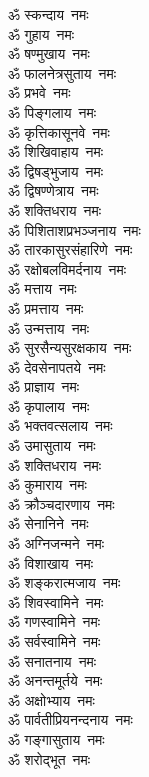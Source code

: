 
\begin{multicols}{2}
\begin{flushleft}
ॐ स्कन्दाय~नमः\\
ॐ गुहाय~नमः\\
ॐ षण्मुखाय~नमः\\
ॐ फालनेत्रसुताय~नमः\\
ॐ प्रभवे~नमः\\
ॐ पिङ्गलाय~नमः\\
ॐ कृत्तिकासूनवे~नमः\\
ॐ शिखिवाहाय~नमः\\
ॐ द्विषड्भुजाय~नमः\\
ॐ द्विषण्णेत्राय~नमः\hfill{}\\
ॐ शक्तिधराय~नमः\\
ॐ पिशिताशप्रभञ्जनाय~नमः\\
ॐ तारकासुरसंहारिणे~नमः\\
ॐ रक्षोबलविमर्दनाय~नमः\\
ॐ मत्ताय~नमः\\
ॐ प्रमत्ताय~नमः\\
ॐ उन्मत्ताय~नमः\\
ॐ सुरसैन्यसुरक्षकाय~नमः\\
ॐ देवसेनापतये~नमः\\
ॐ प्राज्ञाय~नमः\hfill{}\\
ॐ कृपालाय~नमः\\
ॐ भक्तवत्सलाय~नमः\\
ॐ उमासुताय~नमः\\
ॐ शक्तिधराय~नमः\\
ॐ कुमाराय~नमः\\
ॐ क्रौञ्चदारणाय~नमः\\
ॐ सेनानिने~नमः\\
ॐ अग्निजन्मने~नमः\\
ॐ विशाखाय~नमः\\
ॐ शङ्करात्मजाय~नमः\hfill{}\\
ॐ शिवस्वामिने~नमः\\
ॐ गणस्वामिने~नमः\\
ॐ सर्वस्वामिने~नमः\\
ॐ सनातनाय~नमः\\
ॐ अनन्तमूर्तये~नमः\\
ॐ अक्षोभ्याय~नमः\\
ॐ पार्वतीप्रियनन्दनाय~नमः\\
ॐ गङ्गासुताय~नमः\\
ॐ शरोद्भूत~नमः\\

\end{flushleft}
\end{multicols}
